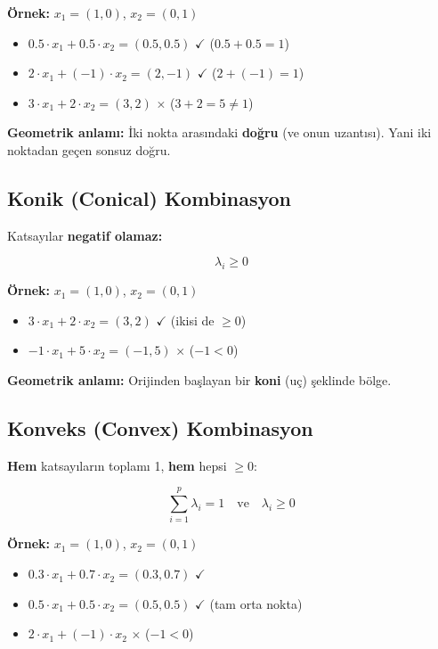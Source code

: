 \documentclass[12pt,a4paper]{article}
\theoremstyle{definition}
\theoremstyle{remark}
\begin{document}
\textbf{\"Ornek:} $x_1 = (1, 0)$, $x_2 = (0, 1)$
\begin{itemize}
    \item $0.5 \cdot x_1 + 0.5 \cdot x_2 = (0.5, 0.5)$ $\checkmark$ ($0.5 + 0.5 = 1$)
    \item $2 \cdot x_1 + (-1) \cdot x_2 = (2, -1)$ $\checkmark$ ($2 + (-1) = 1$)
    \item $3 \cdot x_1 + 2 \cdot x_2 = (3, 2)$ $\times$ ($3 + 2 = 5 \neq 1$)
\end{itemize}

\textbf{Geometrik anlam{\i}:} \.{I}ki nokta aras{\i}ndaki \textbf{do\u{g}ru} (ve onun uzant{\i}s{\i}). Yani iki noktadan ge\c{c}en sonsuz do\u{g}ru.

\subsection{Konik (Conical) Kombinasyon}

Katsay{\i}lar \textbf{negatif olamaz:}

\[
\lambda_i \geq 0
\]

\textbf{\"Ornek:} $x_1 = (1, 0)$, $x_2 = (0, 1)$
\begin{itemize}
    \item $3 \cdot x_1 + 2 \cdot x_2 = (3, 2)$ $\checkmark$ (ikisi de $\geq 0$)
    \item $-1 \cdot x_1 + 5 \cdot x_2 = (-1, 5)$ $\times$ ($-1 < 0$)
\end{itemize}

\textbf{Geometrik anlam{\i}:} Orijinden ba\c{s}layan bir \textbf{koni} (u\c{c}) \c{s}eklinde b\"olge.

\subsection{Konveks (Convex) Kombinasyon}

\textbf{Hem} katsay{\i}lar{\i}n toplam{\i} 1, \textbf{hem} hepsi $\geq 0$:

\[
\sum_{i=1}^{p} \lambda_i = 1 \quad \text{ve} \quad \lambda_i \geq 0
\]

\textbf{\"Ornek:} $x_1 = (1, 0)$, $x_2 = (0, 1)$
\begin{itemize}
    \item $0.3 \cdot x_1 + 0.7 \cdot x_2 = (0.3, 0.7)$ $\checkmark$
    \item $0.5 \cdot x_1 + 0.5 \cdot x_2 = (0.5, 0.5)$ $\checkmark$ (tam orta nokta)
    \item $2 \cdot x_1 + (-1) \cdot x_2$ $\times$ ($-1 < 0$)
\end{itemize}
\end{document}
